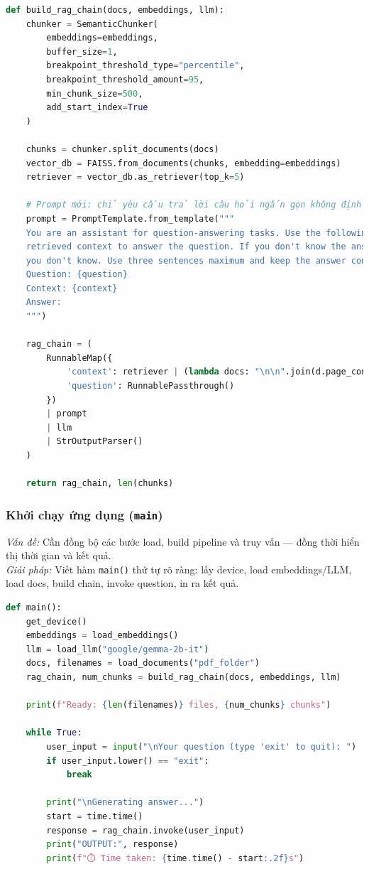 \documentclass[11pt]{article}
\begin{document}
\begin{lstlisting}[language=Python, caption=Xây dựng RAG chain với LangChain]
def build_rag_chain(docs, embeddings, llm):
    chunker = SemanticChunker(
        embeddings=embeddings,
        buffer_size=1,
        breakpoint_threshold_type="percentile",
        breakpoint_threshold_amount=95,
        min_chunk_size=500,
        add_start_index=True
    )

    chunks = chunker.split_documents(docs)
    vector_db = FAISS.from_documents(chunks, embedding=embeddings)
    retriever = vector_db.as_retriever(top_k=5)

    # Prompt mới: chỉ yêu cầu trả lời câu hỏi ngắn gọn không định dạng JSON
    prompt = PromptTemplate.from_template("""
    You are an assistant for question-answering tasks. Use the following pieces of
    retrieved context to answer the question. If you don't know the answer, just say that
    you don't know. Use three sentences maximum and keep the answer concise.
    Question: {question}
    Context: {context}
    Answer:
    """)

    rag_chain = (
        RunnableMap({
            'context': retriever | (lambda docs: "\n\n".join(d.page_content for d in docs)),
            'question': RunnablePassthrough()
        })
        | prompt
        | llm
        | StrOutputParser()
    )

    return rag_chain, len(chunks)
\end{lstlisting}


\subsubsection*{Khởi chạy ứng dụng (\texttt{main})}

\textit{Vấn đề:} Cần đồng bộ các bước load, build pipeline và truy vấn — đồng thời hiển thị thời gian và kết quả.\\
\noindent \textit{Giải pháp:} Viết hàm \texttt{main()} thứ tự rõ ràng: lấy device, load embeddings/LLM, load docs, build chain, invoke question, in ra kết quả.\\

\begin{lstlisting}[language=Python, caption=Hàm chính khởi chạy RAG App]
def main():
    get_device()
    embeddings = load_embeddings()
    llm = load_llm("google/gemma-2b-it")
    docs, filenames = load_documents("pdf_folder")
    rag_chain, num_chunks = build_rag_chain(docs, embeddings, llm)

    print(f"Ready: {len(filenames)} files, {num_chunks} chunks")

    while True:
        user_input = input("\nYour question (type 'exit' to quit): ")
        if user_input.lower() == "exit":
            break

        print("\nGenerating answer...")
        start = time.time()
        response = rag_chain.invoke(user_input)
        print("OUTPUT:", response)
        print(f"⏱️ Time taken: {time.time() - start:.2f}s")
\end{lstlisting}
\end{document}

